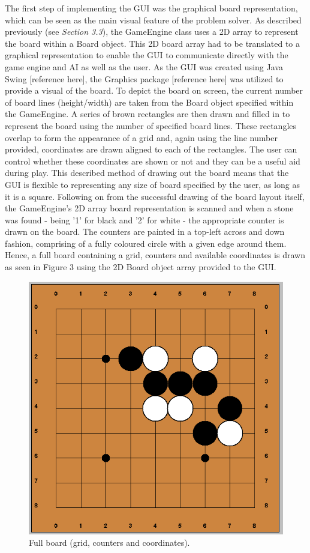 \documentclass{l3proj}
\begin{document}
The first step of implementing the GUI was the graphical board representation, which can be seen as the main visual feature of the problem solver. As described previously (see \textit{Section 3.3}), the GameEngine class uses a 2D array to represent the board within a Board object. This 2D board array had to be translated to a graphical representation to enable the GUI to communicate directly with the game engine and AI as well as the user. As the GUI was created using Java Swing [reference here], the Graphics package [reference here] was utilized to provide a visual of the board. To depict the board on screen, the current number of board lines (height/width) are taken from the Board object specified within the GameEngine. A series of brown rectangles are then drawn and filled in to represent the board using the number of specified board lines. These rectangles overlap to form the appearance of a grid and, again using the line number provided, coordinates are drawn aligned to each of the rectangles. The user can control whether these coordinates are shown or not and they can be a useful aid during play. This described method of drawing out the board means that the GUI is flexible to representing any size of board specified by the user, as long as it is a square. Following on from the successful drawing of the board layout itself, the GameEngine's 2D array board representation is scanned and when a stone was found - being '1' for black and '2' for white - the appropriate counter is drawn on the board. The counters are painted in a top-left across and down fashion, comprising of a fully coloured circle with a given edge around them. Hence, a full board containing a grid, counters and available coordinates is drawn as seen in Figure 3 using the 2D Board object array provided to the GUI.

\begin{figure}[H]
\centering
\includegraphics[scale=0.5]{Images/GUI-3-CountersCoords.png}
\caption{Full board (grid, counters and coordinates).}
\end{figure}
\end{document}
